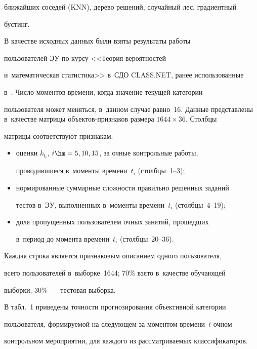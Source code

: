 ближайших соседей (KNN), дерево решений, случайный лес, градиентный 


бустинг. 


     


     В качестве исходных данных были взяты результаты работы 


пользователей ЭУ по курсу <<Теория вероятностей 


и~математическая статистика>> в~СДО CLASS.NET, ранее использованные 


в~\cite{4-nau}. Число моментов времени, когда значение текущей категории 


пользователя может меняться, в~данном случае равно~16. Данные представлены в~качестве матрицы объектов-признаков размера $1644\times36$. Столбцы 


матрицы соответствуют признакам: 


     \begin{itemize}


\item оценки $k_{t_i}$, $i\hm= 5, 10, 15$, за очные контрольные работы, 


проводившиеся в~моменты времени~$t_i$ (столбцы~1--3);


\item нормированные суммарные сложности правильно решенных заданий 


тестов в~ЭУ, выполненных в~моменты времени~$t_i$ (столб\-цы~4--19);


\item доля пропущенных пользователем очных занятий, прошедших 


в~период до момента времени~$t_i$ (столб\-цы~20--36).


\end{itemize}


     


     Каждая строка является признаковым описанием одного пользователя, 


всего пользователей в~выборке~1644; 70\% взято в~качестве обучающей 


выборки; 30\%~--- тестовая выборка.


     


     В табл.~1 приведены точности прогнозирования объективной категории 


пользователя, формируемой на следующем за моментом времени~$t$ очном 


контрольном мероприятии, для каждого из рассматриваемых классификаторов. 


